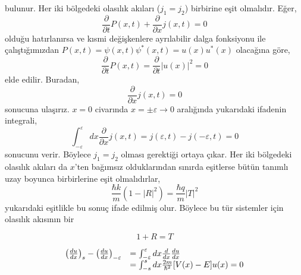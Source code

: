 \documentclass[a4paper,12pt, twoside]{article}
\begin{document}
bulunur. Her iki bölgedeki olasılık akıları ($j_1 = j_2$) birbirine eşit olmalıdır. Eğer,
\begin{equation}
\frac { \partial } { \partial t } P ( x , t ) + \frac { \partial } { \partial x } j ( x , t ) = 0
\end{equation}
olduğu hatırlanırsa ve kısmi değişkenlere ayrılabilir dalga fonksiyonu ile çalıştığımızdan $P(x, t) = \psi(x,t) \psi^*(x,t) = u(x) u^*(x)$ olacağına göre,
\begin{equation}\label{key}
\frac { \partial } { \partial t } P ( x , t ) = \frac { \partial } { \partial t } |u ( x)|^2 = 0
\end{equation}
elde edilir. Buradan,
\begin{equation}
\frac { \partial } { \partial x } j ( x , t ) = 0
\end{equation}
sonucuna ulaşırız. $x=0$ civarında $x=\pm\varepsilon \rightarrow 0$ aralığında yukarıdaki ifadenin integrali,
\begin{equation}
\int^{\varepsilon}_{-\varepsilon} dx \frac { \partial } { \partial x } j ( x , t ) = j (\varepsilon  , t ) - j ( -\varepsilon , t ) = 0
\end{equation}
sonucunu verir. Böylece $j_1 = j_2$ olması gerektiği ortaya çıkar. Her iki bölgedeki olasılık akıları da $x$'ten bağımsız olduklarından sınırda eşitlerse bütün tanımlı uzay boyunca birbirlerine eşit olmalıdırlar,
\begin{equation}
\frac { \hbar k } { m } \left( 1 - | R | ^ { 2 } \right) = \frac { \hbar q } { m } | T | ^ { 2 }
\end{equation}
yukarıdaki eşitlikle bu sonuç ifade edilmiş olur. Böylece bu tür sistemler için olasılık akısının bir 


\begin{equation}
1 + R = T
\end{equation}



\begin{equation}
\begin{array} { r l } { \left( \frac { d u } { d x } \right) _ { s } - \left( \frac { d u } { d x } \right) _ { - \varepsilon } } & { = \int _ { - \varepsilon } ^ { \varepsilon } d x \frac { d } { d x } \frac { d u } { d x } } \\ { } & { = \int _ { - s } ^ { s } d x \frac { 2 m } { \hbar ^ { 2 } } [ V ( x ) - E ] u ( x ) = 0 } \end{array}
\end{equation}
\end{document}
